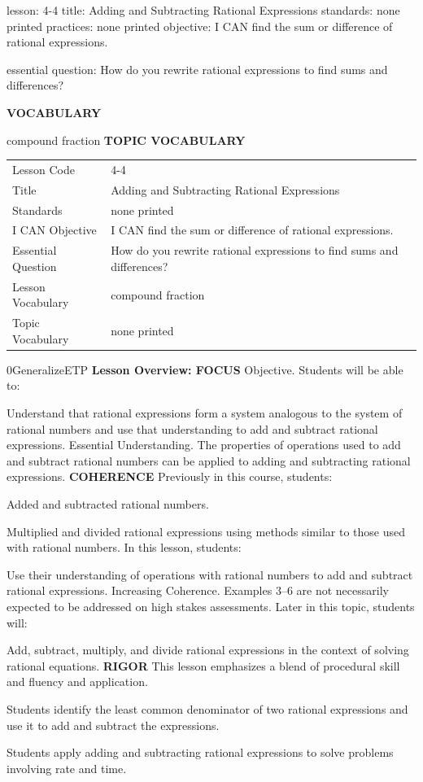 \documentclass{article}
\newenvironment{lesson-meta}{}{}        %
\newenvironment{te-addendum}[2]{}{}     %
\newcommand{\te}[1]{}                   %
\begin{document}
\begin{lesson-meta}
lesson: 4-4
title: Adding and Subtracting Rational Expressions
standards: none printed
practices: none printed
objective: I CAN find the sum or difference of rational expressions.

essential question: How do you rewrite rational expressions to find sums and differences?

\textbf{VOCABULARY}
\item compound fraction
\textbf{TOPIC VOCABULARY}
\te{No topic vocabulary list is printed on these lesson pages.}
\begin{tabular}{ll}
Lesson Code & 4-4 \\
Title & Adding and Subtracting Rational Expressions \\
Standards & none printed \\
I CAN Objective & I CAN find the sum or difference of rational expressions. \\
Essential Question & How do you rewrite rational expressions to find sums and differences? \\
Lesson Vocabulary & compound fraction \\
Topic Vocabulary & none printed \\
\end{tabular}
\end{lesson-meta}
\begin{te-addendum}{0}{GeneralizeETP}
\textbf{Lesson Overview: FOCUS}
Objective. Students will be able to:
\item Understand that rational expressions form a system analogous to the system of rational numbers and use that understanding to add and subtract rational expressions.
Essential Understanding. The properties of operations used to add and subtract rational numbers can be applied to adding and subtracting rational expressions.
\textbf{COHERENCE}
Previously in this course, students:
\item Added and subtracted rational numbers.
\item Multiplied and divided rational expressions using methods similar to those used with rational numbers.
In this lesson, students:
\item Use their understanding of operations with rational numbers to add and subtract rational expressions.
Increasing Coherence. Examples 3--6 are not necessarily expected to be addressed on high stakes assessments.
Later in this topic, students will:
\item Add, subtract, multiply, and divide rational expressions in the context of solving rational equations.
\textbf{RIGOR}
This lesson emphasizes a blend of procedural skill and fluency and application.
\item Students identify the least common denominator of two rational expressions and use it to add and subtract the expressions.
\item Students apply adding and subtracting rational expressions to solve problems involving rate and time.
\end{te-addendum}
\end{document}
